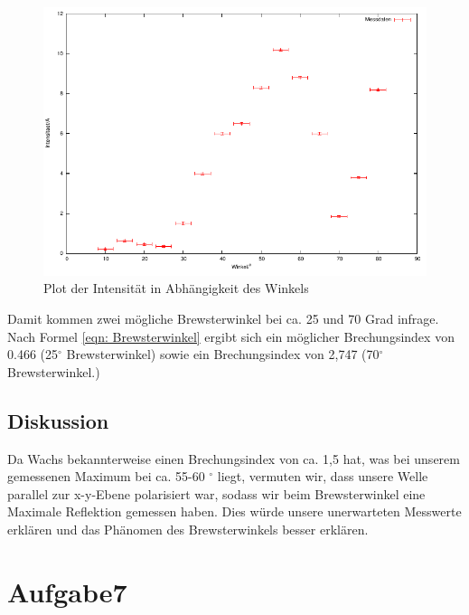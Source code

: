 \documentclass[12pt]{scrartcl}
\begin{document}
\begin{figure}[H]
\centering
    \includegraphics[scale = 1]{a_6.pdf}
  	\caption[Plot der Intensität in Abhängigkeit des Winkels]{Plot der Intensität in Abhängigkeit des Winkels}
  \label{fig:a_6}
\end{figure}
Damit kommen zwei mögliche Brewsterwinkel bei ca. 25 und 70 Grad infrage.
Nach Formel \ref{eqn: Brewsterwinkel} ergibt sich ein möglicher Brechungsindex von 0.466 (25$^{\circ}$ Brewsterwinkel) sowie ein Brechungsindex von 2,747 (70$^{\circ}$ Brewsterwinkel.) 
\subsection{Diskussion}
Da Wachs bekannterweise einen Brechungsindex von ca. 1,5 hat, was bei unserem gemessenen Maximum bei ca. 55-60 $^{\circ}$ liegt, vermuten wir, dass unsere Welle parallel zur x-y-Ebene polarisiert war, sodass wir beim Brewsterwinkel eine Maximale Reflektion gemessen haben. Dies würde unsere unerwarteten Messwerte erklären und das Phänomen des Brewsterwinkels besser erklären.
\section{Aufgabe7}
\end{document}
